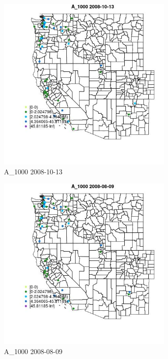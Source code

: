 \begin{figure} 
\centering  
\includegraphics[width=0.77\textwidth]{Code_Outputs/Report_ML_input_PM25_Step4_part_e_de_duplicated_aves_MapObsA_10002008-10-13.jpg} 
\caption{\label{fig:Report_ML_input_PM25_Step4_part_e_de_duplicated_avesMapObsA_10002008-10-13}A_1000 2008-10-13} 
\end{figure} 
 

\begin{figure} 
\centering  
\includegraphics[width=0.77\textwidth]{Code_Outputs/Report_ML_input_PM25_Step4_part_e_de_duplicated_aves_MapObsA_10002008-08-09.jpg} 
\caption{\label{fig:Report_ML_input_PM25_Step4_part_e_de_duplicated_avesMapObsA_10002008-08-09}A_1000 2008-08-09} 
\end{figure} 
 

